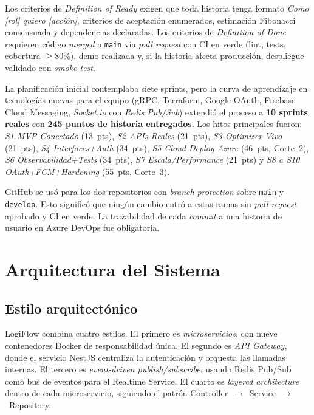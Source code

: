 \documentclass[conference]{IEEEtran}
\begin{document}
Los criterios de \emph{Definition of Ready} exigen que toda historia tenga formato \emph{Como [rol] quiero [acci\'on]}, criterios de aceptaci\'on enumerados, estimaci\'on Fibonacci consensuada y dependencias declaradas. Los criterios de \emph{Definition of Done} requieren c\'odigo \emph{merged} a \texttt{main} v\'ia \emph{pull request} con CI en verde (lint, tests, cobertura $\geq 80\%$), demo realizada y, si la historia afecta producci\'on, despliegue validado con \emph{smoke test}.

La planificaci\'on inicial contemplaba siete sprints, pero la curva de aprendizaje en tecnolog\'ias nuevas para el equipo (gRPC, Terraform, Google OAuth, Firebase Cloud Messaging, \emph{Socket.io} con \emph{Redis Pub/Sub}) extendi\'o el proceso a \textbf{10 sprints reales} con \textbf{245 puntos de historia entregados}. Los hitos principales fueron: \emph{S1 MVP Conectado} (13~pts), \emph{S2 APIs Reales} (21~pts), \emph{S3 Optimizer Vivo} (21~pts), \emph{S4 Interfaces+Auth} (34~pts), \emph{S5 Cloud Deploy Azure} (46~pts, Corte~2), \emph{S6 Observabilidad+Tests} (34~pts), \emph{S7 Escala/Performance} (21~pts) y \emph{S8 a S10 OAuth+FCM+Hardening} (55~pts, Corte~3).

GitHub se us\'o para los dos repositorios con \emph{branch protection} sobre \texttt{main} y \texttt{develop}. Esto signific\'o que ning\'un cambio entr\'o a estas ramas sin \emph{pull request} aprobado y CI en verde. La trazabilidad de cada \emph{commit} a una historia de usuario en Azure DevOps fue obligatoria.

\section{Arquitectura del Sistema}
\label{sec:arquitectura}

\subsection{Estilo arquitect\'onico}

LogiFlow combina cuatro estilos. El primero es \emph{microservicios}, con nueve contenedores Docker de responsabilidad \'unica. El segundo es \emph{API Gateway}, donde el servicio NestJS centraliza la autenticaci\'on y orquesta las llamadas internas. El tercero es \emph{event-driven publish/subscribe}, usando Redis Pub/Sub como bus de eventos para el Realtime Service. El cuarto es \emph{layered architecture} dentro de cada microservicio, siguiendo el patr\'on Controller~$\rightarrow$~Service~$\rightarrow$~Repository.
\end{document}

